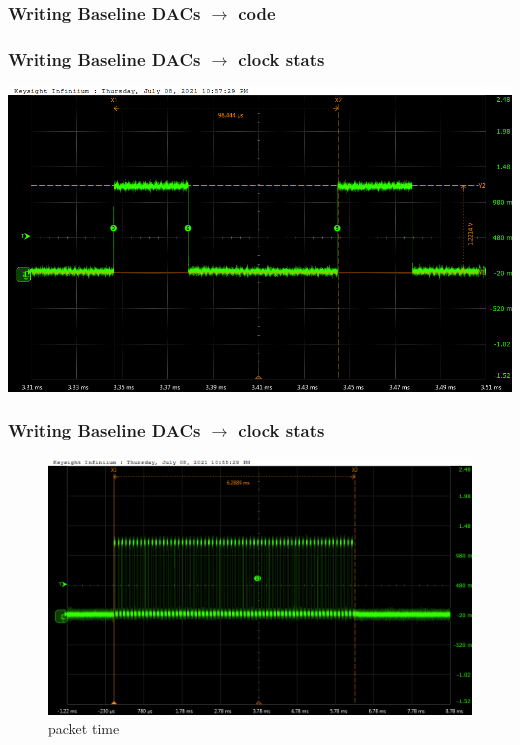 \documentclass[aspectratio=169]{beamer}
\begin{document}
	\begin{frame}
	\frametitle{Writing Baseline DACs $\rightarrow$ code}
	
	\end{frame}

	\begin{frame}
	\frametitle{Writing Baseline DACs $\rightarrow$ clock stats}
	\begin{center}
		\includegraphics[width=0.65 \textwidth]{IMG/probe/09-08-2021_clock-specks.png}
	\end{center}
	\end{frame}

	\begin{frame}
	\frametitle{Writing Baseline DACs $\rightarrow$ clock stats}
	\begin{center}
		\begin{figure}
			\includegraphics[width=0.65 \textwidth]{IMG/probe/09-08-2021_packet-time.png}
			\caption{{\small packet time}}
		\end{figure}
		
		
	\end{center}
	\end{frame}
\end{document}
